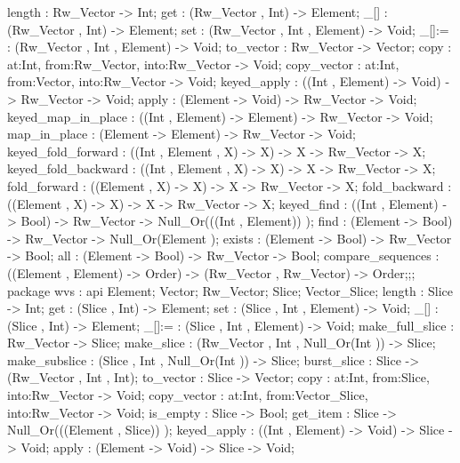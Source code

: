 {{                length : Rw_Vector -> Int;
                get : (Rw_Vector , Int) -> Element;
                _[] : (Rw_Vector , Int) -> Element;
                set : (Rw_Vector , Int , Element) -> Void;
                _[]:= : (Rw_Vector , Int , Element) -> Void;
                to_vector : Rw_Vector -> Vector;
                copy : {at:Int, from:Rw_Vector, into:Rw_Vector} -> Void;
                copy_vector : {at:Int, from:Vector, into:Rw_Vector} -> Void;
                keyed_apply : ((Int , Element) -> Void) -> Rw_Vector -> Void;
                apply : (Element -> Void) -> Rw_Vector -> Void;
                keyed_map_in_place : ((Int , Element) -> Element) -> Rw_Vector -> Void;
                map_in_place : (Element -> Element) -> Rw_Vector -> Void;
                keyed_fold_forward : ((Int , Element , X) -> X) -> X -> Rw_Vector -> X;
                keyed_fold_backward : ((Int , Element , X) -> X) -> X -> Rw_Vector -> X;
                fold_forward : ((Element , X) -> X) -> X -> Rw_Vector -> X;
                fold_backward : ((Element , X) -> X) -> X -> Rw_Vector -> X;
                keyed_find : ((Int , Element) -> Bool) -> Rw_Vector -> Null_Or(((Int , Element)) );
                find : (Element -> Bool) -> Rw_Vector -> Null_Or(Element );
                exists : (Element -> Bool) -> Rw_Vector -> Bool;
                all : (Element -> Bool) -> Rw_Vector -> Bool;
                compare_sequences : ((Element , Element) -> Order) -> (Rw_Vector , Rw_Vector) -> Order;};;
        package wvs
          : api {
                Element;
                Vector;
                Rw_Vector;
                Slice;
                Vector_Slice;
                length : Slice -> Int;
                get : (Slice , Int) -> Element;
                set : (Slice , Int , Element) -> Void;
                _[] : (Slice , Int) -> Element;
                _[]:= : (Slice , Int , Element) -> Void;
                make_full_slice : Rw_Vector -> Slice;
                make_slice : (Rw_Vector , Int , Null_Or(Int )) -> Slice;
                make_subslice : (Slice , Int , Null_Or(Int )) -> Slice;
                burst_slice : Slice -> (Rw_Vector , Int , Int);
                to_vector : Slice -> Vector;
                copy : {at:Int, from:Slice, into:Rw_Vector} -> Void;
                copy_vector : {at:Int, from:Vector_Slice, into:Rw_Vector} -> Void;
                is_empty : Slice -> Bool;
                get_item : Slice -> Null_Or(((Element , Slice)) );
                keyed_apply : ((Int , Element) -> Void) -> Slice -> Void;
                apply : (Element -> Void) -> Slice -> Void;
}}

